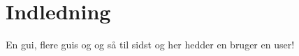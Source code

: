 \chapter{Indledning}

En \gls{gui}, flere \glspl{gui} og \cite{fysikbog} og så til sidst \cite{rcf} og her hedder en bruger en \gls{user}!

\lipsum[5-7]

